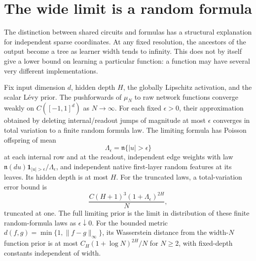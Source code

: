 \section{The wide limit is a random formula}
\label{sec:wide-formula-limit}
The distinction between shared circuits and formulas has a structural explanation for independent sparse coordinates. At any fixed resolution, the ancestors of the output become a tree as learner width tends to infinity. This does not by itself give a lower bound on learning a particular function: a function may have several very different implementations.

\begin{theorem}
\label{thm:wide-formula-limit}
Fix input dimension $d$, hidden depth $H$, the globally Lipschitz activation, and the scalar L\'evy prior. The pushforwards of $\mu_N$ to raw network functions converge weakly on $C([-1,1]^d)$ as $N\to\infty$. For each fixed $\epsilon>0$, their approximation obtained by deleting internal/readout jumps of magnitude at most $\epsilon$ converges in total variation to a finite random formula law. The limiting formula has Poisson offspring of mean
\[
 \Lambda_\epsilon=\mathfrak n\{|u|>\epsilon\}
\]
at each internal row and at the readout, independent edge weights with law
$\mathfrak n(du)\mathbf1_{|u|>\epsilon}/\Lambda_\epsilon$, and independent native first-layer random features at its leaves. Its hidden depth is at most $H$. For the truncated laws, a total-variation error bound is
\[
 \frac{C(H+1)^3(1+\Lambda_\epsilon)^{2H}}{N},
\]
truncated at one. The full limiting prior is the limit in distribution of these finite random-formula laws as $\epsilon\downarrow0$. For the bounded metric $d(f,g)=\min\{1,\|f-g\|_\infty\}$, its Wasserstein distance from the width-$N$ function prior is at most $C_H(1+\log N)^{2H}/N$ for $N\ge2$, with fixed-depth constants independent of width.
\end{theorem}
